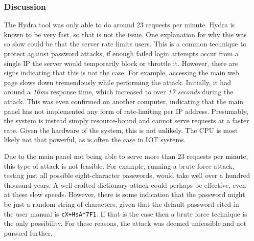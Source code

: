 \subsubsection{Discussion}
The Hydra tool was only able to do around 23 requests per minute. Hydra is known to be very fast, so that is not the issue. One explanation for why this was so slow could be that the server rate limits users. This is a common technique to protect against password attacks, if enough failed login attempts occur from a single IP the server would temporarily block or throttle it. However, there are signs indicating that this is not the case. For example, accessing the main web page slows down tremendously while performing the attack. Initially, it had around a \textit{16ms} response time, which increased to over \textit{17 seconds} during the attack. This was even confirmed on another computer, indicating that the main panel has not implemented any form of rate-limiting per IP address. Presumably, the system is instead simply resource-bound and cannot serve requests at a faster rate. Given the hardware of the system, this is not unlikely. The CPU is most likely not that powerful, as is often the case in \gls{IOT} systems.

Due to the main panel not being able to serve more than 23 requests per minute, this type of attack is not feasible. For example, running a brute force attack, testing just all possible eight-character passwords, would take well over a hundred thousand years. A well-crafted dictionary attack could perhaps be effective, even at these slow speeds. However, there is some indication that the password might be just a random string of characters, given that the default password cited in the user manual is \texttt{cX+HsA*7F1}. If that is the case then a brute force technique is the only possibility. For these reasons, the attack was deemed unfeasible and not pursued further.
